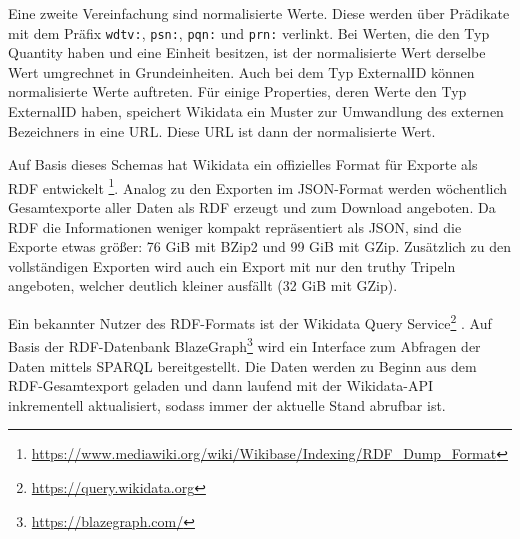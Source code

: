Eine zweite Vereinfachung sind normalisierte Werte.
Diese werden über Prädikate mit dem Präfix \verb|wdtv:|, \verb|psn:|, \verb|pqn:| und \verb|prn:| verlinkt.
Bei Werten, die den Typ Quantity haben und eine Einheit besitzen, ist der normalisierte Wert derselbe Wert umgrechnet in Grundeinheiten.
Auch bei dem Typ ExternalID können normalisierte Werte auftreten.
Für einige Properties, deren Werte den Typ ExternalID haben, speichert Wikidata ein Muster zur Umwandlung des externen Bezeichners in eine URL.
Diese URL ist dann der normalisierte Wert.

Auf Basis dieses Schemas hat Wikidata ein offizielles Format für Exporte als RDF entwickelt \footnote{\url{https://www.mediawiki.org/wiki/Wikibase/Indexing/RDF_Dump_Format}}.
Analog zu den Exporten im JSON-Format werden wöchentlich Gesamtexporte aller Daten als RDF erzeugt und zum Download angeboten.
Da RDF die Informationen weniger kompakt repräsentiert als JSON, sind die Exporte etwas größer: 76 GiB mit BZip2 und 99 GiB mit GZip.
Zusätzlich zu den vollständigen Exporten wird auch ein Export mit nur den truthy Tripeln angeboten, welcher deutlich kleiner ausfällt (32 GiB mit GZip).

Ein bekannter Nutzer des RDF-Formats ist der Wikidata Query Service\footnote{\url{https://query.wikidata.org}} \cite{wd-sparql}.
Auf Basis der RDF-Datenbank BlazeGraph\footnote{\url{https://blazegraph.com/}} wird ein Interface zum Abfragen der Daten mittels SPARQL bereitgestellt.
Die Daten werden zu Beginn aus dem RDF-Gesamtexport geladen und dann laufend mit der Wikidata-API inkrementell aktualisiert, sodass immer der aktuelle Stand abrufbar ist.